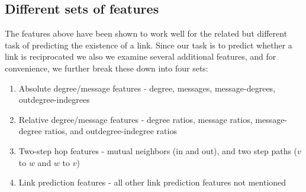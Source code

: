 \documentclass[conference]{IEEEtran}
\begin{document}
\subsection{Different sets of features}
The features above have been shown to work well for the related but different task of predicting the existence of a link. Since our task is to predict whether a link is reciprocated we also we examine several additional features, and for convenience, we further break these down into four sets:
\begin{enumerate}
	\item Absolute degree/message features - degree, messages, message-degrees, outdegree-indegrees
	\item Relative degree/message features - degree ratios, message ratios, message-degree ratios, and outdegree-indegree ratios
	\item Two-step hop features - mutual neighbors (in and out), and two step paths ($v$ to $w$ and $w$ to $v$)
	\item Link prediction features - all other link prediction features not mentioned
\end{enumerate}
\end{document}
